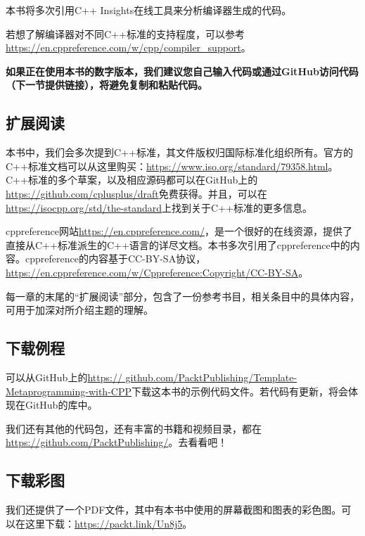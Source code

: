 本书将多次引用C++ Insights在线工具来分析编译器生成的代码。

若想了解编译器对不同C++标准的支持程度，可以参考\url{https://en.cppreference.com/w/cpp/compiler_support}。

\textbf{
如果正在使用本书的数字版本，我们建议您自己输入代码或通过GitHub访问代码（下一节提供链接），将避免复制和粘贴代码。
}

\subsection{扩展阅读}

本书中，我们会多次提到C++标准，其文件版权归国际标准化组织所有。官方的C++标准文档可以从这里购买：\url{https://www.iso.org/standard/79358.html}。C++标准的多个草案，以及相应源码都可以在GitHub上的\url{https://github.com/cplusplus/draft}免费获得。并且，可以在\url{https://isocpp.org/std/the-standard}上找到关于C++标准的更多信息。

cppreference网站\url{https://en.cppreference.com/}，是一个很好的在线资源，提供了直接从C++标准派生的C++语言的详尽文档。本书多次引用了cppreference中的内容。cppreference的内容基于CC-BY-SA协议，\url{https://en.cppreference.com/w/Cppreference:Copyright/CC-BY-SA}。

每一章的末尾的“扩展阅读”部分，包含了一份参考书目，相关条目中的具体内容，可用于加深对所介绍主题的理解。

\subsection{下载例程}

可以从GitHub上的\url{https:// github.com/PacktPublishing/Template-Metaprogramming-with-CPP}下载这本书的示例代码文件。若代码有更新，将会体现在GitHub的库中。

我们还有其他的代码包，还有丰富的书籍和视频目录，都在\url{https://github.com/PacktPublishing/}。去看看吧！

\subsection{下载彩图}

我们还提供了一个PDF文件，其中有本书中使用的屏幕截图和图表的彩色图。可以在这里下载：\url{https://packt.link/Un8j5}。








